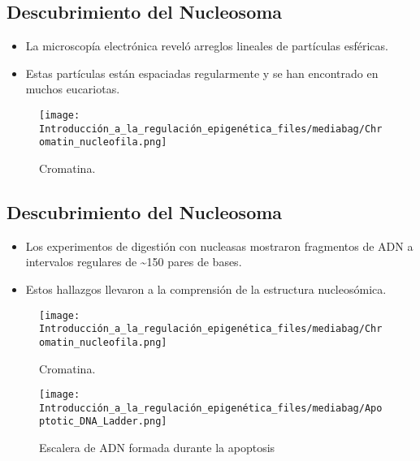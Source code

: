 \documentclass[
  letterpaper,
  DIV=11,
  numbers=noendperiod]{scrartcl}
\begin{document}
\subsection{Descubrimiento del
Nucleosoma}\label{descubrimiento-del-nucleosoma}

\begin{itemize}
\item
  La microscopía electrónica reveló arreglos lineales de partículas
  esféricas.
\item
  Estas partículas están espaciadas regularmente y se han encontrado en
  muchos eucariotas.
\end{itemize}

\begin{figure}[H]

{\centering \texttt{[image: Introducción\_a\_la\_regulación\_epigenética\_files/mediabag/Chromatin\_nucleofila.png]}

}

\caption{Cromatina.}

\end{figure}%

\subsection{Descubrimiento del
Nucleosoma}\label{descubrimiento-del-nucleosoma-1}

\begin{itemize}
\item
  Los experimentos de digestión con nucleasas mostraron fragmentos de
  ADN a intervalos regulares de \textasciitilde150 pares de bases.
\item
  Estos hallazgos llevaron a la comprensión de la estructura
  nucleosómica.
\end{itemize}

\begin{figure}[H]

{\centering \texttt{[image: Introducción\_a\_la\_regulación\_epigenética\_files/mediabag/Chromatin\_nucleofila.png]}

}

\caption{Cromatina.}

\end{figure}%
\begin{figure}[H]

{\centering \texttt{[image: Introducción\_a\_la\_regulación\_epigenética\_files/mediabag/Apoptotic\_DNA\_Ladder.png]}

}

\caption{Escalera de ADN formada durante la apoptosis}

\end{figure}%
\end{document}
